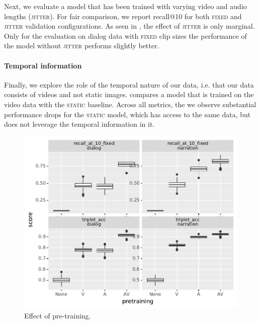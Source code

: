 Next, we evaluate a model that has been trained with varying video and audio 
lengths (\textsc{jitter}). For fair comparison, we report recall@10 for both 
\textsc{fixed} and \textsc{jitter} validation configurations.
As seen in , the effect of \textsc{jitter} is only marginal. 
Only for the evaluation on dialog data with \textsc{fixed} clip sizes 
the performance of the model without \textsc{jitter} performs slightly 
better.


\paragraph{Temporal information}
Finally, we explore the role of the temporal nature of our data, i.e. that our 
data consists of videos and not static images.
 compares a model that is trained on the video data with the 
\textsc{static} baseline. Across all metrics, the we observe substantial 
performance drops for the \textsc{static} model, which has access to the same 
data, but does not leverage the temporal information in it.






\begin{figure}[htb]
	\centering
	\includegraphics[width=\columnwidth]{results/ablations/pretraining.pdf}
	\caption{Effect of pre-training.}
	\label{fig:pretraining}
\end{figure}

